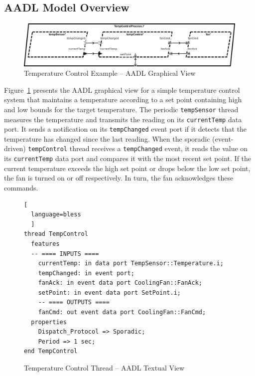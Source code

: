 

\subsection{AADL Model Overview}

\begin{figure}[htbp]
  \centerline{\includegraphics[width=16cm]{temp-control-graphical.png}}
  \caption{Temperature Control Example -- AADL Graphical View}
  \label{fig:temp-control-graphical}
\end{figure}

Figure~\ref{fig:temp-control-graphical} presents the AADL graphical
view for a simple temperature control system that maintains a
temperature according to a set point containing high and low bounds
for the target temperature.
The periodic \texttt{tempSensor} thread measures the temperature and
transmits the reading on its \texttt{currentTemp} data port.  It sends
a notification on its \texttt{tempChanged} event port if it detects
that the temperature has changed since the last reading.  When the
sporadic (event-driven) \texttt{tempControl} thread receives a
\texttt{tempChanged} event, it reads the value on its
\texttt{currentTemp} data port and compares it with the most recent
set point.  If the current temperature exceeds the high set point or 
drops below the low set point, the fan is turned on or off respectively. 
In turn, the fan acknowledges these commands.


\begin{figure}[htbp]
\begin{lstlisting}[
  language=bless
  ]
thread TempControl
  features
  -- ==== INPUTS ==== 
    currentTemp: in data port TempSensor::Temperature.i;
    tempChanged: in event port;
    fanAck: in event data port CoolingFan::FanAck;
    setPoint: in event data port SetPoint.i;
    -- ==== OUTPUTS ==== 
    fanCmd: out event data port CoolingFan::FanCmd;
  properties
    Dispatch_Protocol => Sporadic;
    Period => 1 sec;
end TempControl    
\end{lstlisting}
\caption{Temperature Control Thread -- AADL Textual View}
\label{fig:temp-control-thread-textual}
\end{figure}

